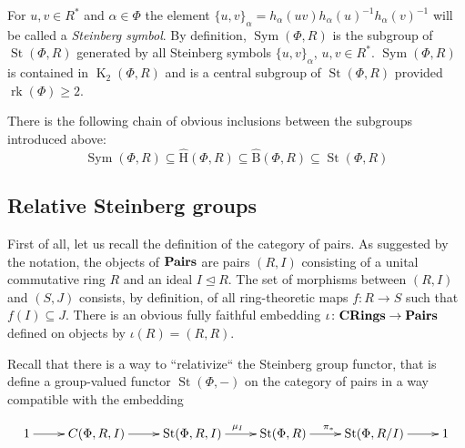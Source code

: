 \documentclass[oneside, 10pt]{amsart}
\DeclareMathOperator{\St}{St}
\DeclareMathOperator{\K}{K}
\DeclareMathOperator{\rk}{rk}
\DeclareMathOperator{\Sym}{Sym}
\newcommand{\catname}[1]{{\normalfont\textbf{#1}}}
\newcommand{\StB}{\hat{\mathrm{B}}}     %
\newcommand{\StH}{\hat{\mathrm{H}}}     %
\newcommand{\ext}[1]{\mu_{#1}}           %
\numberwithin{equation}{section}
\numberwithin{lemma}{section}
\theoremstyle{definition}
\theoremstyle{remark}
\begin{document}
For $u, v \in R^*$ and $\alpha\in\Phi$ the element $\{u,v\}_\alpha=h_\alpha(uv)h_\alpha(u)^{-1}h_\alpha(v)^{-1}$ will be
 called a {\it Steinberg symbol}. By definition, $\Sym(\Phi, R)$ is the subgroup of $\St(\Phi, R)$ generated by all Steinberg symbols $\{u, v\}_\alpha$, $u, v \in R^*$. 
$\Sym(\Phi, R)$ is contained in $\K_2(\Phi, R)$ and is a central subgroup of $\St(\Phi, R)$ provided $\rk(\Phi)\geq 2$.

There is the following chain of obvious inclusions between the subgroups introduced above:
\begin{equation}
  \Sym(\Phi, R) \subseteq \StH(\Phi, R) \subseteq \StB(\Phi, R) \subseteq \St(\Phi, R)
\end{equation}

\subsection{Relative Steinberg groups} \label{sec:relative-steinberg}
First of all, let us recall the definition of the category of pairs. 
As suggested by the notation, the objects of $\catname{Pairs}$ are pairs $(R, I)$ consisting of a unital commutative ring $R$ and an ideal $I \trianglelefteq R$.
The set of morphisms between $(R, I)$ and $(S, J)$ consists, by definition, of all ring-theoretic maps $f\colon R\to S$ such that $f(I)\subseteq J$.
There is an obvious fully faithful embedding $\iota\colon \catname{CRings} \to \catname{Pairs}$ defined on objects by $\iota(R) = (R, R)$.

Recall that there is a way to ``relativize`` the Steinberg group functor, that is define a group-valued functor $\St(\Phi, -)$ on the category of pairs
 in a way compatible with the embedding 

\begin{equation}
 \xymatrix{ 1 \ar[r] & C(\Phi, R, I) \ar[r] & \St(\Phi, R, I) \ar[r]^{\ext{I}} & \St(\Phi, R) \ar[r]^{\pi_*} & \St(\Phi, R/I) \ar[r] & 1 }
\end{equation}
\end{document}
